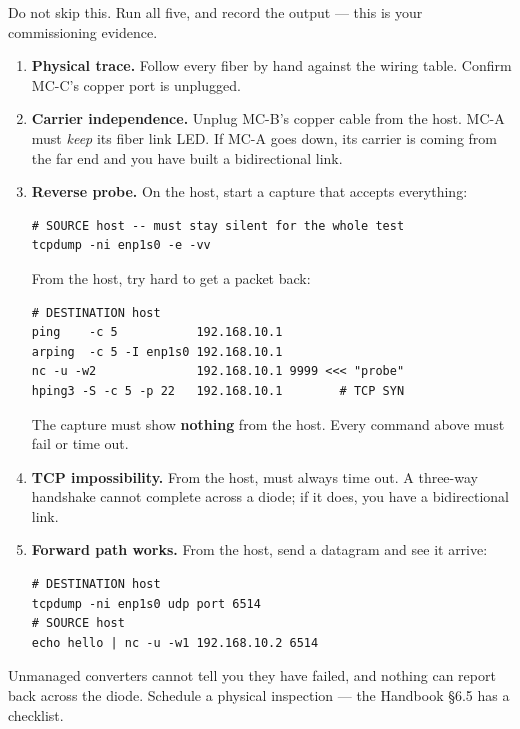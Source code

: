 \documentclass[11pt,a4paper]{article}
\begin{document}
Do not skip this. Run all five, and record the output --- this is your
commissioning evidence.

\begin{enumerate}
\item \textbf{Physical trace.} Follow every fiber by hand against the wiring
      table. Confirm MC-C's copper port is unplugged.

\item \textbf{Carrier independence.} Unplug MC-B's copper cable from the
      \dstside{} host. MC-A must \emph{keep} its fiber link LED. If MC-A goes
      down, its carrier is coming from the far end and you have built a
      bidirectional link.

\item \textbf{Reverse probe.} On the \srcside{} host, start a capture that
      accepts everything:
\begin{lstlisting}[style=shell]
# SOURCE host -- must stay silent for the whole test
tcpdump -ni enp1s0 -e -vv
\end{lstlisting}
      From the \dstside{} host, try hard to get a packet back:
\begin{lstlisting}[style=shell]
# DESTINATION host
ping    -c 5           192.168.10.1
arping  -c 5 -I enp1s0 192.168.10.1
nc -u -w2              192.168.10.1 9999 <<< "probe"
hping3 -S -c 5 -p 22   192.168.10.1        # TCP SYN
\end{lstlisting}
      The \srcside{} capture must show \textbf{nothing} from the \dstside{}
      host. Every command above must fail or time out.

\item \textbf{TCP impossibility.} From the \dstside{} host,
       must always time out. A three-way
      handshake cannot complete across a diode; if it does, you have a
      bidirectional link.

\item \textbf{Forward path works.} From the \srcside{} host, send a datagram
      and see it arrive:
\begin{lstlisting}[style=shell]
# DESTINATION host
tcpdump -ni enp1s0 udp port 6514
# SOURCE host
echo hello | nc -u -w1 192.168.10.2 6514
\end{lstlisting}
\end{enumerate}

\begin{notebox}
Unmanaged converters cannot tell you they have failed, and nothing can report
back across the diode. Schedule a physical inspection --- the Handbook \S6.5
has a checklist.
\end{notebox}
\end{document}
